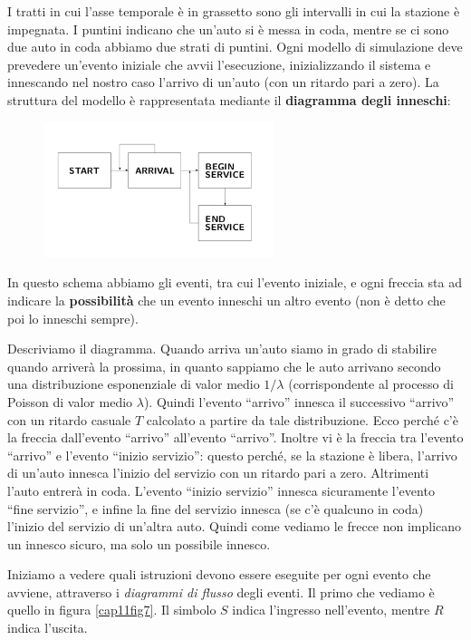\documentclass[11pt]{book}
\begin{document}
I tratti in cui l'asse temporale \`e in grassetto sono gli intervalli
in cui la stazione \`e impegnata. I puntini indicano che un'auto si \`e
messa in coda, mentre se ci sono due auto in coda abbiamo due strati
di puntini. Ogni modello di simulazione deve prevedere un'evento
iniziale che avvii l'esecuzione, inizializzando il sistema e
innescando nel nostro caso l'arrivo di un'auto (con un ritardo pari a
zero). La struttura del modello \`e rappresentata mediante il {\bf
  diagramma degli inneschi}:

\begin{figure}[H]
  \centering
  \includegraphics[width=0.6\textwidth]{images/cap11fig6.png}
\end{figure}

In questo schema abbiamo gli eventi, tra cui l'evento iniziale, e ogni
freccia sta ad indicare la {\bf possibilit\`a} che un evento inneschi
un altro evento (non \`e detto che poi lo inneschi sempre).
 
Descriviamo il diagramma. Quando arriva un'auto siamo in grado di
stabilire quando arriver\`a la prossima, in quanto sappiamo che le auto
arrivano secondo una distribuzione esponenziale di valor medio
$1/\lambda$ (corrispondente al processo di Poisson di valor medio
$\lambda$). Quindi l'evento ``arrivo'' innesca il successivo
``arrivo'' con un ritardo casuale $T$ calcolato a partire da tale
distribuzione. Ecco perch\'e c'\`e la freccia dall'evento ``arrivo''
all'evento ``arrivo''. Inoltre vi \`e la freccia tra l'evento
``arrivo'' e l'evento ``inizio servizio'': questo perch\'e, se la
stazione \`e libera, l'arrivo di un'auto innesca l'inizio del servizio
con un ritardo pari a zero. Altrimenti l'auto entrer\`a in
coda. L'evento ``inizio servizio'' innesca sicuramente l'evento ``fine
servizio'', e infine la fine del servizio innesca (se c'\`e qualcuno in
coda) l'inizio del servizio di un'altra auto. Quindi come vediamo le
frecce non implicano un innesco sicuro, ma solo un possibile innesco.

Iniziamo a vedere quali istruzioni devono essere eseguite per ogni
evento che avviene, attraverso i {\em diagrammi di flusso} degli
eventi. Il primo che vediamo \`e quello in figura \ref{cap11fig7}. Il
simbolo $S$ indica l'ingresso nell'evento, mentre $R$ indica l'uscita.
\end{document}
